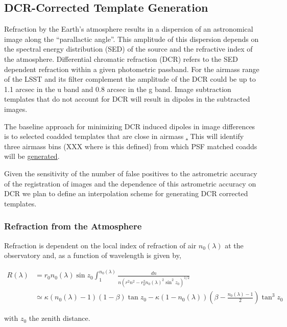 \subsection{DCR-Corrected Template Generation}
\label{sec:acDCRTemplates}

Refraction by the Earth's atmosphere results in a dispersion of an
astronomical image along the ``parallactic angle''. This amplitude of
this dispersion depends on the spectral energy distribution (SED) of
the source and the refractive index of the atmosphere. Differential
chromatic refraction (DCR) refers to the SED dependent refraction
within a given photometric passband. For the airmass range of the LSST
and its filter complement the amplitude of the DCR could be up to 1.1
arcsec in the u band and 0.8 arcsec in the g band. Image subtraction
templates that do not account for DCR will result in dipoles in the
subtracted images.

The baseline approach for minimizing DCR induced dipoles in image
differences is to selected coadded templates that are close in airmass
\hyperref[sec:acRetrievTemplate]. This will identify three airmass bins (XXX
where is this defined) from which PSF matched coadds will be \hyperref[sec:acCoaddition]{generated}.

Given the sensitivity of the number of false positives to the
astrometric accuracy of the registration of images and the dependence
of this astrometric accuracy on DCR we plan to define an interpolation
scheme for generating DCR corrected templates.

\subsubsection{Refraction from the Atmosphere}

Refraction is dependent on the local index of refraction of air $n_0(\lambda)$ at the observatory and, as a function of wavelength is given by, 

\begin{align}
R(\lambda) &= r_0 n_0(\lambda) \sin z_0 \int_1^{n_0(\lambda)} \frac{dn}{n \left(r^2n^2 -r_0^2n_0(\lambda)^2\sin^2z_0\right)^{1/2}} \nonumber\\
&\simeq \kappa (n_0(\lambda) - 1) (1 - \beta) \tan z_0 - \kappa (1 - n_0(\lambda)) \left(\beta - \frac{n_0(\lambda) - 1}{2}\right) \tan^3z_0
\end{align}

with $z_0$ the zenith distance.


